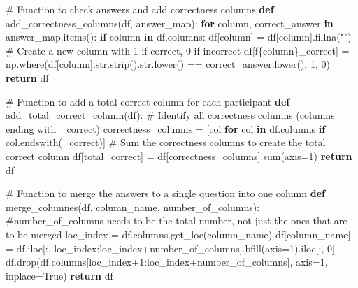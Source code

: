 \documentclass[
  letterpaper,
  DIV=11,
  numbers=noendperiod]{scrartcl}
\newenvironment{Shaded}{\begin{snugshade}}{\end{snugshade}}
\newcommand{\BuiltInTok}[1]{\textcolor[rgb]{0.00,0.23,0.31}{#1}}
\newcommand{\CommentTok}[1]{\textcolor[rgb]{0.37,0.37,0.37}{#1}}
\newcommand{\ControlFlowTok}[1]{\textcolor[rgb]{0.00,0.23,0.31}{\textbf{#1}}}
\newcommand{\DecValTok}[1]{\textcolor[rgb]{0.68,0.00,0.00}{#1}}
\newcommand{\KeywordTok}[1]{\textcolor[rgb]{0.00,0.23,0.31}{\textbf{#1}}}
\newcommand{\NormalTok}[1]{\textcolor[rgb]{0.00,0.23,0.31}{#1}}
\newcommand{\OperatorTok}[1]{\textcolor[rgb]{0.37,0.37,0.37}{#1}}
\newcommand{\SpecialCharTok}[1]{\textcolor[rgb]{0.37,0.37,0.37}{#1}}
\newcommand{\SpecialStringTok}[1]{\textcolor[rgb]{0.13,0.47,0.30}{#1}}
\newcommand{\StringTok}[1]{\textcolor[rgb]{0.13,0.47,0.30}{#1}}
\newcommand{\VariableTok}[1]{\textcolor[rgb]{0.07,0.07,0.07}{#1}}
\begin{document}
\begin{Shaded}
\begin{Highlighting}[]
\CommentTok{\# Function to check answers and add correctness columns}
\KeywordTok{def}\NormalTok{ add\_correctness\_columns(df, answer\_map):}
    \ControlFlowTok{for}\NormalTok{ column, correct\_answer }\KeywordTok{in}\NormalTok{ answer\_map.items():}
        \ControlFlowTok{if}\NormalTok{ column }\KeywordTok{in}\NormalTok{ df.columns:}
\NormalTok{            df[column] }\OperatorTok{=}\NormalTok{ df[column].fillna(}\StringTok{""}\NormalTok{)}
            \CommentTok{\# Create a new column with 1 if correct, 0 if incorrect}
\NormalTok{            df[}\SpecialStringTok{f\textquotesingle{}}\SpecialCharTok{\{}\NormalTok{column}\SpecialCharTok{\}}\SpecialStringTok{\_correct\textquotesingle{}}\NormalTok{] }\OperatorTok{=}\NormalTok{ np.where(df[column].}\BuiltInTok{str}\NormalTok{.strip().}\BuiltInTok{str}\NormalTok{.lower() }\OperatorTok{==}\NormalTok{ correct\_answer.lower(), }\DecValTok{1}\NormalTok{, }\DecValTok{0}\NormalTok{)}
    \ControlFlowTok{return}\NormalTok{ df}

\CommentTok{\# Function to add a total correct column for each participant}
\KeywordTok{def}\NormalTok{ add\_total\_correct\_column(df):}
    \CommentTok{\# Identify all correctness columns (columns ending with \textquotesingle{}\_correct\textquotesingle{})}
\NormalTok{    correctness\_columns }\OperatorTok{=}\NormalTok{ [col }\ControlFlowTok{for}\NormalTok{ col }\KeywordTok{in}\NormalTok{ df.columns }\ControlFlowTok{if}\NormalTok{ col.endswith(}\StringTok{\textquotesingle{}\_correct\textquotesingle{}}\NormalTok{)]}
    \CommentTok{\# Sum the correctness columns to create the total correct column}
\NormalTok{    df[}\StringTok{\textquotesingle{}total\_correct\textquotesingle{}}\NormalTok{] }\OperatorTok{=}\NormalTok{ df[correctness\_columns].}\BuiltInTok{sum}\NormalTok{(axis}\OperatorTok{=}\DecValTok{1}\NormalTok{)}
    \ControlFlowTok{return}\NormalTok{ df}
  
\CommentTok{\# Function to merge the answers to a single question into one column}
\KeywordTok{def}\NormalTok{ merge\_columnes(df, column\_name, number\_of\_columns):}
  \CommentTok{\#number\_of\_columns needs to be the total number, not just the ones that are to be merged}
\NormalTok{  loc\_index }\OperatorTok{=}\NormalTok{ df.columns.get\_loc(column\_name)}
\NormalTok{  df[column\_name] }\OperatorTok{=}\NormalTok{ df.iloc[:, loc\_index:loc\_index}\OperatorTok{+}\NormalTok{number\_of\_columns].bfill(axis}\OperatorTok{=}\DecValTok{1}\NormalTok{).iloc[:, }\DecValTok{0}\NormalTok{]}
\NormalTok{  df.drop(df.columns[loc\_index}\OperatorTok{+}\DecValTok{1}\NormalTok{:loc\_index}\OperatorTok{+}\NormalTok{number\_of\_columns], axis}\OperatorTok{=}\DecValTok{1}\NormalTok{, inplace}\OperatorTok{=}\VariableTok{True}\NormalTok{)}
  \ControlFlowTok{return}\NormalTok{ df}


\end{Highlighting}
\end{Shaded}
\end{document}
